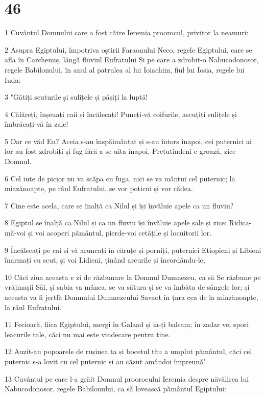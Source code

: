 \chapter{46}

\par 1 Cuvântul Domnului care a fost către Ieremia proorocul, privitor la neamuri:
\par 2 Asupra Egiptului, împotriva oștirii Faraonului Neco, regele Egiptului, care se afla în Carchemiș, lângă fluviul Eufratului Și pe care a zdrobit-o Nabucodonosor, regele Babilonului, în anul al patrulea al lui Ioiachim, fiul lui Iosia, regele lui Iuda:
\par 3 "Gătiți scuturile și sulițele și pășiți la luptă!
\par 4 Călăreți, înșeuați caii și încălecați! Puneți-vă coifurile, ascuțiți sulițele și îmbrăcați-vă în zale!
\par 5 Dar ce văd Eu? Aceia s-au înspăimântat și s-au întors înapoi, cei puternici ai lor au fost zdrobiți și fug fără a se uita înapoi. Pretutindeni e groază, zice Domnul.
\par 6 Cel iute de picior nu va scăpa cu fuga, nici se va mântui cel puternic; la miazănoapte, pe râul Eufratului, se vor poticni și vor cădea.
\par 7 Cine este acela, care se înalță ca Nilul și își învăluie apele ca un fluviu?
\par 8 Egiptul se înalță ca Nilul și ca un fluviu își învăluie apele sale și zice: Ridica-mă-voi și voi acoperi pământul, pierde-voi cetățile și locuitorii lor.
\par 9 Încălecați pe cai și vă aruncați în căruțe și porniți, puternici Etiopieni și Libieni înarmați cu scut, și voi Lidieni, ținând arcurile și încordându-le,
\par 10 Căci ziua aceasta e zi de răzbunare la Domnul Dumnezeu, ca să Se răzbune pe vrăjmașii Săi, și sabia va mânca, se va sătura și se va îmbăta de sângele lor; și aceasta va fi jertfă Domnului Dumnezeului Savaot în țara cea de la miazănoapte, la râul Eufratului.
\par 11 Fecioară, fiica Egiptului, mergi în Galaad și ia-ți balsam; în zadar vei spori leacurile tale, căci nu mai este vindecare pentru tine.
\par 12 Auzit-au popoarele de rușinea ta și bocetul tău a umplut pământul, căci cel puternic s-a lovit cu cel puternic și au căzut amândoi împreună".
\par 13 Cuvântul pe care l-a grăit Domnul proorocului Ieremia despre năvălirea lui Nabucodonosor, regele Babilonului, ca să lovească pământul Egiptului:
